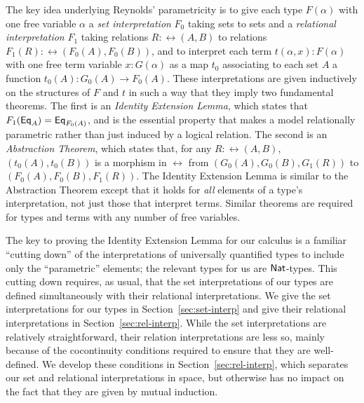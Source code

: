 \documentclass[runningheads]{llncs}
\begin{document}
The key idea underlying Reynolds' parametricity is to give each type
$F(\alpha)$ with one free variable $\alpha$ a {\em set
  interpretation} $F_0$ taking sets to sets and a \emph{relational
  interpretation} $F_1$ taking relations $R : \rel(A,B)$ to relations
$F_1 (R) : \rel(F_0 (A), F_0 (B))$, and to interpret each term
$t(\alpha,x) : F(\alpha)$ with one free term variable $x : G(\alpha)$
as a map $t_0$ associating to each set $A$ a function $t_0(A) : G_0(A)
\to F_0(A)$. These interpretations are given inductively on the
structures of $F$ and $t$ in such a way that they imply two
fundamental theorems. The first is an \emph{Identity Extension Lemma},
which states that $F_1(\mathsf{Eq}_A) = \mathsf{Eq}_{F_0(A)}$, and is the essential
property that makes a model relationally parametric rather than just
induced by a logical relation. The second is an \emph{Abstraction
  Theorem}, which states that, for any $R :\rel(A, B)$,
$(t_0(A),t_0(B))$ is a morphism in $\rel$ from
$(G_0(A),G_0(B),G_1(R))$ to $(F_0(A),F_0(B),F_1(R))$. The Identity
Extension Lemma is similar to the Abstraction Theorem except that it
holds for {\em all} elements of a type's interpretation, not just
those that interpret terms.
Similar theorems are required for types and terms with any number of
free variables.

The key to proving the Identity Extension Lemma
for our calculus is a familiar ``cutting down'' of the interpretations
of universally quantified types to include only the ``parametric''
elements; the relevant types for us are $\mathsf{Nat}$-types.
This cutting down requires, as usual, that the set interpretations of
our types are defined simultaneously with their relational
interpretations. We give the set interpretations for our types in
Section~\ref{sec:set-interp} and give their relational interpretations
in Section~\ref{sec:rel-interp}.  While the set interpretations are
relatively straightforward, their relation interpretations are less
so, mainly because of the cocontinuity conditions required to ensure
that they are well-defined. We develop these conditions in
Section~\ref{sec:rel-interp}, which separates
our set and relational interpretations in space, but otherwise has no
impact on the fact that they are given by mutual induction.

\vspace*{-0.15in}
\end{document}
